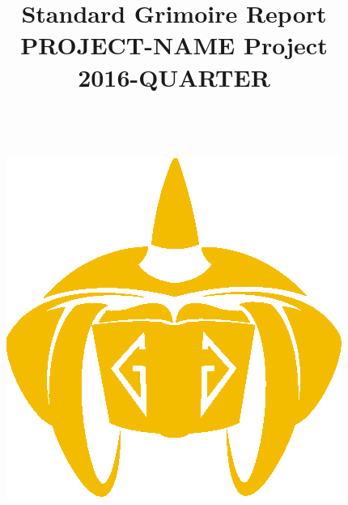 \documentclass[a4wide,11pt]{article}
\begin{document}
\title{Standard Grimoire Report \\
  PROJECT-NAME Project \\
      2016-QUARTER \\
        ~~\\~~\\  \includegraphics[scale=.35]{logo}       \\}




\maketitle


\newpage
~~\\~\\~\\~\\


~~\\~~\\

~~\\
~~\\

\begin{tabular}{p{5cm}p{10cm}}

\end{tabular}
\end{document}
